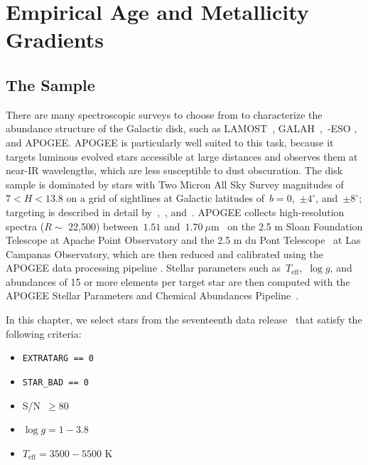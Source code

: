 
\section{Empirical Age and Metallicity Gradients}
\label{outflows:sec:empirical}

\subsection{The Sample}
\label{outflows:sec:empirical:apogee}
There are many spectroscopic surveys to choose from to characterize the
abundance structure of the Galactic disk, such as
LAMOST~\citep{Luo2015}, GALAH~\citep{DeSilva2015, Martell2017},~\gaia-ESO
\citep{Gilmore2012}, and APOGEE\space\citep{Majewski2017}.
APOGEE is particularly well suited to this task, because it targets luminous
evolved stars accessible at large distances and observes them at near-IR
wavelengths, which are less susceptible to dust obscuration.
The disk sample is dominated by stars with Two Micron All Sky Survey
\citep{Skrutskie2006} magnitudes of~$7 < H < 13.8$ on a grid of sightlines at
Galactic latitudes of~$b = 0$,~$\pm 4^\circ$, and~$\pm 8^\circ$; targeting is
described in detail by~\citet{Zasowski2013, Zasowski2017},~\citet{Beaton2021},
and~\citet{Santana2021}.
APOGEE collects high-resolution spectra ($R \sim$ 22,500) between~$1.51$
and~$1.70~\mu$m~\citep{Wilson2019} on the 2.5 m Sloan Foundation Telescope
\citep{Gunn2006} at Apache Point Observatory and the 2.5 m du Pont
Telescope~\citep{Bowen1973} at Las Campanas Observatory, which are then
reduced and calibrated using the APOGEE data processing pipeline
\citep{Nidever2015}.
Stellar parameters such as~$T_\text{eff}$,~$\log g$, and abundances of 15 or
more elements per target star are then computed with the APOGEE Stellar
Parameters and Chemical Abundances Pipeline~\citep[ASPCAP;][]{Holtzman2015,
GarciaPerez2016}.
\par
In this chapter, we select stars from the seventeenth data
release~\citep[DR17;][]{Abdurrouf2022} that satisfy the following criteria:
\begin{itemize}

	\item \texttt{EXTRATARG == 0}

	\item \texttt{STAR\_BAD == 0}

	\item S/N~$\geq 80$

	\item $\log g = 1 - 3.8$

	\item $T_\text{eff} = 3500 - 5500$ K

\end{itemize}
